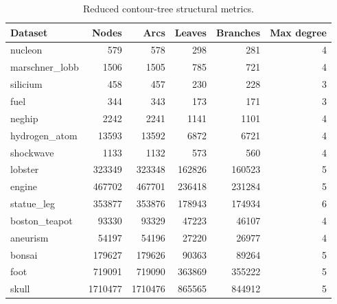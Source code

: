 \begin{table}[htbp]
\centering
\small
\caption{Reduced contour-tree structural metrics.}
\label{tab:reduced-tree-metrics}
\begin{tabular}{lrrrrr}
\hline
Dataset & Nodes & Arcs & Leaves & Branches & Max degree \\
\hline
nucleon & 579 & 578 & 298 & 281 & 4 \\
marschner\_lobb & 1506 & 1505 & 785 & 721 & 4 \\
silicium & 458 & 457 & 230 & 228 & 3 \\
fuel & 344 & 343 & 173 & 171 & 3 \\
neghip & 2242 & 2241 & 1141 & 1101 & 4 \\
hydrogen\_atom & 13593 & 13592 & 6872 & 6721 & 4 \\
shockwave & 1133 & 1132 & 573 & 560 & 4 \\
lobster & 323349 & 323348 & 162826 & 160523 & 5 \\
engine & 467702 & 467701 & 236418 & 231284 & 5 \\
statue\_leg & 353877 & 353876 & 178943 & 174934 & 6 \\
boston\_teapot & 93330 & 93329 & 47223 & 46107 & 4 \\
aneurism & 54197 & 54196 & 27220 & 26977 & 4 \\
bonsai & 179627 & 179626 & 90363 & 89264 & 5 \\
foot & 719091 & 719090 & 363869 & 355222 & 5 \\
skull & 1710477 & 1710476 & 865565 & 844912 & 5 \\
\hline
\end{tabular}
\end{table}
